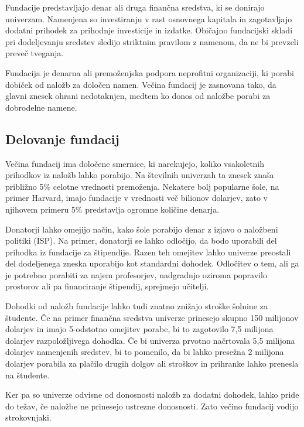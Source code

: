 \documentclass[12pt, a4paper]{article}
\begin{document}
Fundacije predstavljajo denar ali druga finančna sredstva, ki se donirajo univerzam. Namenjena so investiranju v rast osnovnega kapitala in zagotavljajo dodatni prihodek za prihodnje investicije in izdatke. Običajno fundacijski skladi pri dodeljevanju sredstev sledijo striktnim pravilom z namenom, da ne bi prevzeli preveč tveganja. 

Fundacija je denarna ali premoženjska podpora neprofitni organizaciji, ki porabi dobiček od naložb za določen namen. Večina fundacij je zasnovana tako, da glavni znesek ohrani nedotaknjen, medtem ko donos od naložbe porabi za dobrodelne namene. 

\subsection{Delovanje fundacij}

Večina fundacij ima določene smernice, ki narekujejo, koliko vsakoletnih prihodkov iz naložb lahko porabijo. Na številnih univerzah ta znesek znaša približno 5\% celotne vrednosti premoženja. Nekatere bolj popularne šole, na primer Harvard, imajo fundacije v vrednosti več bilionov dolarjev, zato v njihovem primeru 5\% predstavlja ogromne količine denarja. \cite{Investopedia}

Donatorji lahko omejijo način, kako šole porabijo denar z izjavo o naložbeni politiki (ISP). Na primer, donatorji se lahko odločijo, da bodo uporabili del prihodka iz fundacije za štipendije. Razen teh omejitev lahko univerze preostali del dodeljenega zneska uporabijo kot standardni dohodek. Odločitev o tem, ali ga je potrebno porabiti za najem profesorjev, nadgradnjo oziroma popravilo prostorov ali pa financiranje štipendij, sprejmejo učitelji. 

Dohodki od naložb fundacije lahko tudi znatno znižajo stroške šolnine za študente. Če na primer finančna sredstva univerze prinesejo skupno 150 milijonov dolarjev in imajo 5-odstotno omejitev porabe, bi to zagotovilo 7,5 milijona dolarjev razpoložljivega dohodka. Če bi univerza prvotno načrtovala 5,5 milijona dolarjev namenjenih sredstev, bi to pomenilo, da bi lahko presežna 2 milijona dolarjev porabila za plačilo drugih dolgov ali stroškov in prihranke lahko prenesla na študente. \cite{Investopedia}

Ker pa so univerze odvisne od donosnosti naložb za dodatni dohodek, lahko pride do težav, če naložbe ne prinesejo ustrezne donosnosti. Zato večino fundacij vodijo strokovnjaki.
\end{document}
